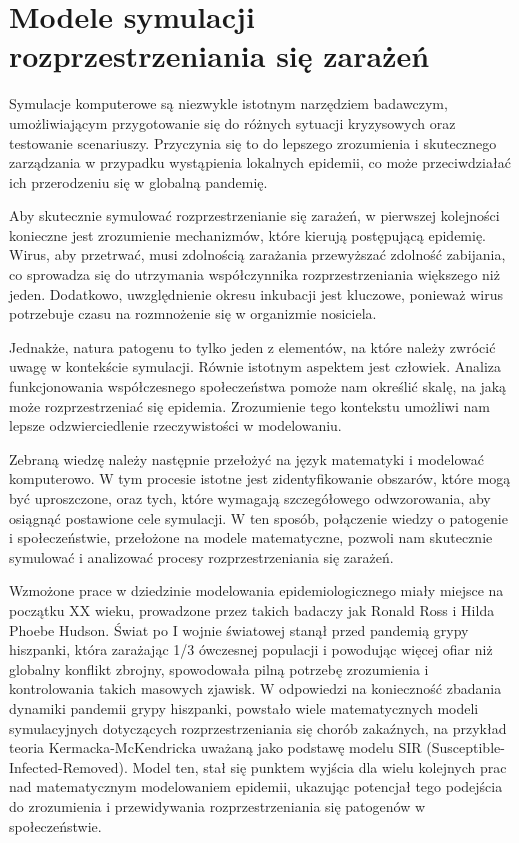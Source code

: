 \chapter{Modele symulacji rozprzestrzeniania się zarażeń}
Symulacje komputerowe są niezwykle istotnym narzędziem badawczym, umożliwiającym przygotowanie się do różnych sytuacji kryzysowych oraz testowanie scenariuszy. Przyczynia się to do lepszego zrozumienia i skutecznego zarządzania w przypadku wystąpienia lokalnych epidemii, co może przeciwdziałać ich przerodzeniu się w globalną pandemię.

Aby skutecznie symulować rozprzestrzenianie się zarażeń, w pierwszej kolejności  konieczne jest zrozumienie mechanizmów, które kierują postępującą epidemię. Wirus, aby przetrwać, musi zdolnością zarażania przewyższać zdolność zabijania, co sprowadza się do utrzymania współczynnika rozprzestrzeniania większego niż jeden. Dodatkowo, uwzględnienie okresu inkubacji jest kluczowe, ponieważ wirus potrzebuje czasu na rozmnożenie się w organizmie nosiciela.

Jednakże, natura patogenu to tylko jeden z elementów, na które należy zwrócić uwagę w kontekście symulacji. Równie istotnym aspektem jest człowiek. Analiza funkcjonowania współczesnego społeczeństwa pomoże nam określić skalę, na jaką może rozprzestrzeniać się epidemia. Zrozumienie tego kontekstu umożliwi nam lepsze odzwierciedlenie rzeczywistości w modelowaniu.

Zebraną wiedzę należy następnie przełożyć na język matematyki i modelować komputerowo. W tym procesie istotne jest zidentyfikowanie obszarów, które mogą być uproszczone, oraz tych, które wymagają szczegółowego odwzorowania, aby osiągnąć postawione cele symulacji. W ten sposób, połączenie wiedzy o patogenie i społeczeństwie, przełożone na modele matematyczne, pozwoli nam skutecznie symulować i analizować procesy rozprzestrzeniania się zarażeń. 

Wzmożone prace w dziedzinie modelowania epidemiologicznego miały miejsce na początku XX wieku, prowadzone przez takich badaczy jak Ronald Ross\cite{bib:RossRonald} i Hilda Phoebe Hudson\cite{bib:RossHudson}\cite{bib:RossHudson2}. Świat po I wojnie światowej stanął przed pandemią grypy hiszpanki, która zarażając 1/3 ówczesnej populacji i powodując więcej ofiar niż globalny konflikt zbrojny\cite{bib:cdc1918pandemic}, spowodowała pilną potrzebę zrozumienia i kontrolowania takich masowych zjawisk. W odpowiedzi na konieczność zbadania dynamiki pandemii grypy hiszpanki, powstało wiele matematycznych modeli symulacyjnych dotyczących rozprzestrzeniania się chorób zakaźnych, na przykład teoria Kermacka-McKendricka\cite{bib:Kermack} uważaną jako podstawę modelu SIR (Susceptible-Infected-Removed). Model ten, stał się punktem wyjścia dla wielu kolejnych prac nad matematycznym modelowaniem epidemii, ukazując potencjał tego podejścia do zrozumienia i przewidywania rozprzestrzeniania się patogenów w społeczeństwie.

